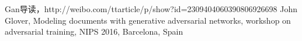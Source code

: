 \begin{thebibliography}{99}
 Gan导读，http://weibo.com/ttarticle/p/show?id=2309404060390806926698
 John Glover, Modeling documents with generative adversarial networks, workshop on adversarial training, NIPS 2016, Barcelona, Spain

\end{thebibliography}

 
